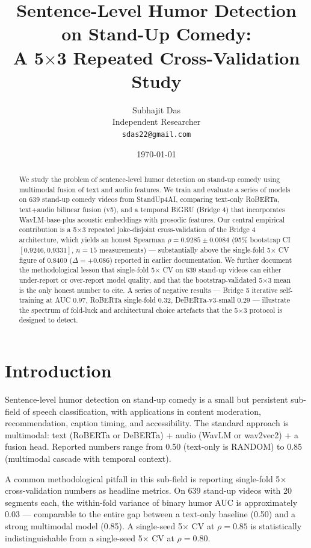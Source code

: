 \documentclass[11pt, letterpaper]{article}
\title{Sentence-Level Humor Detection on Stand-Up Comedy:\\
       A 5$\times$3 Repeated Cross-Validation Study}
\author{Subhajit Das \\
Independent Researcher \\
\texttt{sdas22@gmail.com}}
\date{\today}
\begin{document}
\maketitle

\begin{abstract}
We study the problem of sentence-level humor detection on stand-up comedy using multimodal fusion of text and audio features. We train and evaluate a series of models on 639 stand-up comedy videos from StandUp4AI, comparing text-only RoBERTa, text+audio bilinear fusion (v5), and a temporal BiGRU (Bridge 4) that incorporates WavLM-base-plus acoustic embeddings with prosodic features. Our central empirical contribution is a 5$\times$3 repeated joke-disjoint cross-validation of the Bridge 4 architecture, which yields an honest Spearman $\rho = 0.9285 \pm 0.0084$ (95\% bootstrap CI $[0.9246, 0.9331]$, $n=15$ measurements) --- substantially above the single-fold 5$\times$ CV figure of 0.8400 ($\Delta = +0.086$) reported in earlier documentation. We further document the methodological lesson that single-fold 5$\times$ CV on 639 stand-up videos can either under-report or over-report model quality, and that the bootstrap-validated 5$\times$3 mean is the only honest number to cite. A series of negative results --- Bridge 5 iterative self-training at AUC 0.97, RoBERTa single-fold 0.32, DeBERTa-v3-small 0.29 --- illustrate the spectrum of fold-luck and architectural choice artefacts that the 5$\times$3 protocol is designed to detect.
\end{abstract}

\section{Introduction}

Sentence-level humor detection on stand-up comedy is a small but persistent sub-field of speech classification, with applications in content moderation, recommendation, caption timing, and accessibility. The standard approach is multimodal: text (RoBERTa or DeBERTa) + audio (WavLM or wav2vec2) + a fusion head. Reported numbers range from 0.50 (text-only is RANDOM) to 0.85 (multimodal cascade with temporal context).

A common methodological pitfall in this sub-field is reporting single-fold 5$\times$ cross-validation numbers as headline metrics. On 639 stand-up videos with 20 segments each, the within-fold variance of binary humor AUC is approximately 0.03 --- comparable to the entire gap between a text-only baseline (0.50) and a strong multimodal model (0.85). A single-seed 5$\times$ CV at $\rho = 0.85$ is statistically indistinguishable from a single-seed 5$\times$ CV at $\rho = 0.80$.
\end{document}
